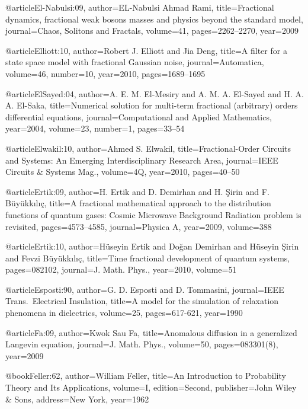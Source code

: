 \begin{thebibliography}{99}
@article{El-Nabulsi:09,
  author={EL-Nabulsi Ahmad Rami},
  title={Fractional dynamics, fractional weak bosons masses and physics beyond
    the standard model},
  journal={Chaos, Solitons and Fractals},
  volume={41},
  pages={2262--2270},
  year={2009}
}

@article{Elliott:10,
  author={Robert J. Elliott and Jia Deng},
  title={A filter for a state space model with fractional Gaussian noise},
  journal={Automatica},
  volume={46},
  number={10},
  year={2010},
  pages={1689--1695}
}

@article{ElSayed:04,
  author={A. E. M. El-Mesiry and A. M. A. El-Sayed and H. A. A. El-Saka},
  title={Numerical solution for multi-term fractional (arbitrary) orders differential
    equations},
  journal={Computational and Applied Mathematics},
  year={2004},
  volume={23},
  number={1},
  pages={33--54}
}

@article{Elwakil:10,
  author={Ahmed S. Elwakil},
  title={Fractional-Order Circuits and Systems: An Emerging Interdisciplinary Research
    Area},
  journal={IEEE Circuits {\&} Systems Mag.},
  volume={4Q},
  year={2010},
  pages={40--50}
}

@article{Ertik:09,
  author={H. Ertik and D. Demirhan and H. \c{S}irin and F. B\"{u}y\"{u}kk{\i}l{\i}\c{c}},
  title={A fractional mathematical approach to the distribution functions of quantum
    gases: {C}osmic Microwave Background Radiation problem is revisited},
  pages={4573--4585},
  journal={Physica A},
  year={2009},
  volume={388}
}

@article{Ertik:10,
  author={H\"{u}seyin Ertik and Do\u{g}an Demirhan and H\"{u}seyin \c{S}irin and
    Fevzi B\"{u}y\"{u}kk{\i}l{\i}\c{c}},
  title={Time fractional development of quantum systems},
  pages={082102},
  journal={J. Math. Phys.},
  year={2010},
  volume={51}
}

@article{Esposti:90,
  author={G. D. Esposti and D. Tommasini},
  journal={IEEE Trans.\ Electrical Insulation},
  title={A model for the simulation of relaxation phenomena in dielectrics},
  volume={25},
  pages={617-621},
  year={1990}
}

@article{Fa:09,
  author={Kwok Sau Fa},
  title={Anomalous diffusion in a generalized {L}angevin equation},
  journal={J. Math. Phys.},
  volume={50},
  pages={083301(8)},
  year={2009}
}

@book{Feller:62,
  author={William Feller},
  title={An Introduction to Probability Theory and Its Applications},
  volume={I},
  edition={Second},
  publisher={John Wiley {\&} Sons},
  address={New York},
  year={1962}
}


\end{thebibliography}
